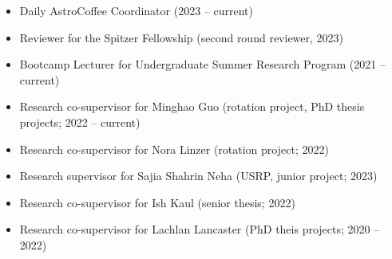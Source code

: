\documentclass[12pt]{article}
\begin{document}
\begin{itemize}
    \item Daily AstroCoffee Coordinator (2023 -- current)
    \item Reviewer for the Spitzer Fellowship (second round reviewer, 2023)
    \item Bootcamp Lecturer for Undergraduate Summer Research Program (2021 -- current)
    \item Research co-supervisor for Minghao Guo (rotation project, PhD thesis projects; 2022 -- current)
    \item Research co-supervisor for Nora Linzer (rotation project; 2022)
    \item Research supervisor for Sajia Shahrin Neha (USRP, junior project; 2023)
    \item Research co-supervisor for Ish Kaul (senior thesis; 2022)
    \item Research co-supervisor for Lachlan Lancaster (PhD theis projects; 2020 -- 2022)
\end{itemize}
\end{document}
